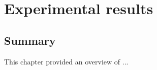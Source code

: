\chapter{Experimental results}
\label{chapter:experimentalresults}

\section*{Summary}
This chapter provided an overview of ...